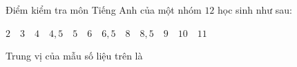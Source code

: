 \begin{ex}
Điểm kiểm tra môn Tiếng Anh của một nhóm $12$ học sinh như sau:
\begin{center}
$2$\ \ $3$\ \ $4$\ \ $4{,}5$\ \ $5$\ \ $6$\ \ $6{,}5$\ \ $8$\ \ $8{,}5$\ \ $9$\ \ $10$\ \ $11$
\end{center}
Trung vị của mẫu số liệu trên là
\end{ex}
